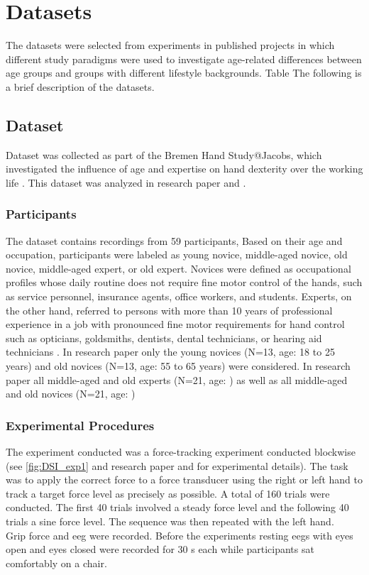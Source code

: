 \section{Datasets}
The datasets were selected from experiments in published projects in which different study paradigms were used to investigate age-related differences between age groups and groups with different lifestyle backgrounds. Table The following is a brief description of the datasets. 

\subsection{Dataset }
\label{methods:datasets:I}
Dataset  was collected as part of the Bremen Hand Study@Jacobs, which investigated the influence of age and expertise on hand dexterity over the working life \cite{Voelcker-Rehage2013}. This dataset was analyzed in research paper  \cite{Goelz2021a} and  \cite{Gaidai2022}.

\subsubsection{Participants}
\label{methods:datasets:I:participants}
The dataset contains recordings from 59 participants, Based on their age and occupation, participants were labeled as young novice, middle-aged novice, old novice, middle-aged expert, or old expert. Novices were defined as occupational profiles whose daily routine does not require fine motor control of the hands, such as service personnel, insurance agents, office workers, and students. Experts, on the other hand, referred to persons with more than 10 years of professional experience in a job with pronounced fine motor requirements for hand control such as opticians, goldsmiths, dentists, dental technicians, or hearing aid technicians \cite{Ericsson1991}. In research paper  only the young novices (N=13, age: 18 to 25 years) and old novices (N=13, age: 55 to 65 years) were considered. In research paper  all middle-aged and old experts (N=21, age: ) as well as all middle-aged and old novices (N=21, age: )

\subsubsection{Experimental Procedures}
\label{methods:datasets:I:experiment}
The experiment conducted was a force-tracking experiment conducted blockwise (see \autoref{fig:DSI_exp1} and research paper  and  for experimental details). The task was to apply the correct force to a force transducer using the right or left hand to track a target force level as precisely as possible. A total of 160 trials were conducted. The first 40 trials involved a steady force level and the following 40 trials a sine force level. The sequence was then repeated with the left hand.\\
Grip force and \gls{eeg} were recorded. Before the experiments resting \glspl{eeg} with eyes open and eyes closed were recorded for 30 s each while participants sat comfortably on a chair.

